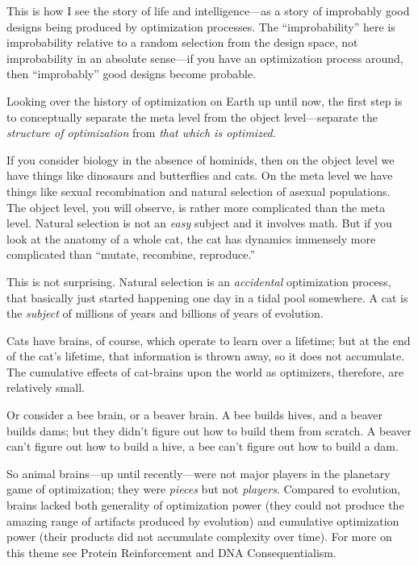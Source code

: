 {
 This is how I see the story of life and intelligence---as a story
of improbably good designs being produced by optimization processes.
The ``improbability'' here is
improbability relative to a random selection from the design space, not
improbability in an absolute sense---if you have an optimization
process around, then ``improbably''
good designs become probable.}

{
 Looking over the history of optimization on Earth up until now,
the first step is to conceptually separate the meta level from the
object level---separate the \textit{structure of optimization} from
\textit{that which is optimized}.}

{
 If you consider biology in the absence of hominids, then on the
object level we have things like dinosaurs and butterflies and cats. On
the meta level we have things like sexual recombination and natural
selection of asexual populations. The object level, you will observe,
is rather more complicated than the meta level. Natural selection is
not an \textit{easy} subject and it involves math. But if you look at
the anatomy of a whole cat, the cat has dynamics immensely more
complicated than ``mutate, recombine,
reproduce.''}

{
 This is not surprising. Natural selection is an
\textit{accidental} optimization process, that basically just started
happening one day in a tidal pool somewhere. A cat is the
\textit{subject} of millions of years and billions of years of
evolution.}

{
 Cats have brains, of course, which operate to learn over a
lifetime; but at the end of the cat's lifetime, that
information is thrown away, so it does not accumulate. The cumulative
effects of cat-brains upon the world as optimizers, therefore, are
relatively small.}

{
 Or consider a bee brain, or a beaver brain. A bee builds hives,
and a beaver builds dams; but they didn't figure out
how to build them from scratch. A beaver can't figure
out how to build a hive, a bee can't figure out how to
build a dam.}

{
 So animal brains---up until recently---were not major players in
the planetary game of optimization; they were \textit{pieces} but not
\textit{players}. Compared to evolution, brains lacked both generality
of optimization power (they could not produce the amazing range of
artifacts produced by evolution) and cumulative optimization power
(their products did not accumulate complexity over time). For more on
this theme see Protein Reinforcement and DNA Consequentialism.}

